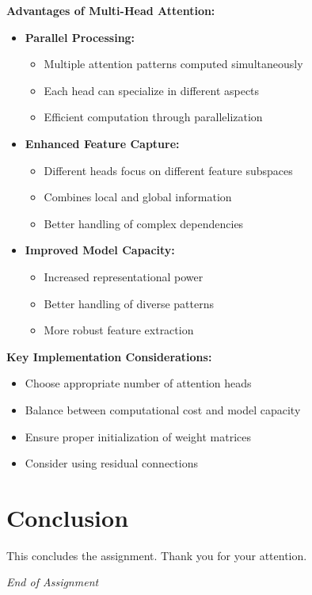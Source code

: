 \documentclass{exam}
\begin{document}
\begin{example}
\textbf{Advantages of Multi-Head Attention:}
\begin{itemize}[leftmargin=*]
    \item \textbf{Parallel Processing:}
        \begin{itemize}
            \item Multiple attention patterns computed simultaneously
            \item Each head can specialize in different aspects
            \item Efficient computation through parallelization
        \end{itemize}
    \item \textbf{Enhanced Feature Capture:}
        \begin{itemize}
            \item Different heads focus on different feature subspaces
            \item Combines local and global information
            \item Better handling of complex dependencies
        \end{itemize}
    \item \textbf{Improved Model Capacity:}
        \begin{itemize}
            \item Increased representational power
            \item Better handling of diverse patterns
            \item More robust feature extraction
        \end{itemize}
\end{itemize}
\end{example}

\begin{important}
\textbf{Key Implementation Considerations:}
\begin{itemize}[leftmargin=*]
    \item Choose appropriate number of attention heads
    \item Balance between computational cost and model capacity
    \item Ensure proper initialization of weight matrices
    \item Consider using residual connections
\end{itemize}
\end{important}

\section*{Conclusion}
This concludes the assignment. Thank you for your attention.

\begin{flushright}
\textit{End of Assignment}
\end{flushright}
\end{document}
